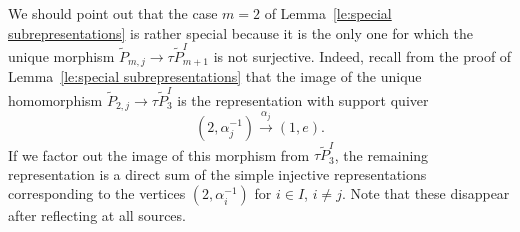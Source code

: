 \documentclass[smallextended,envcountsect,envcountsame]{svjour3}
\numberwithin{equation}{section}
\begin{document}
\begin{remark}
  \label{rem:special case}
  We should point out that the case $m=2$ of Lemma~\ref{le:special subrepresentations} is rather special because it is the only one for which the unique morphism $\tilde P_{m,j}\to\tau\tilde P_{m+1}^I$ is not surjective.
  Indeed, recall from the proof of Lemma~\ref{le:special subrepresentations} that the image of the unique homomorphism $\tilde P_{2,j}\to\tau\tilde P_3^I$ is the representation with support quiver
  \begin{equation}
    \label{eq:special case}
    (2,\alpha_j^{-1})\xrightarrow{\alpha_j}(1,e).
  \end{equation}
  If we factor out the image of this morphism from $\tau\tilde P_3^I$, the remaining representation is a direct sum of the simple injective representations corresponding to the vertices $(2,\alpha_i^{-1})$ for $i\in I$, $i\ne j$.
  Note that these disappear after reflecting at all sources.
\end{remark}
\end{document}
